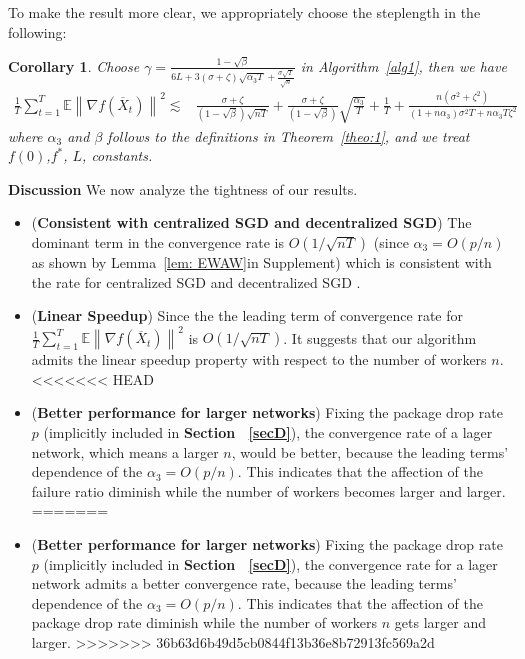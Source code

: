\documentclass{article}
\renewcommand{\paragraph}[1]{\noindent\textbf{#1}}
\newcounter{thm_counter}
\newtheorem{corollary}[thm_counter]{Corollary}
\begin{document}
To make the result more clear, we appropriately choose the steplength in the following:
\begin{corollary}\label{coro1}
Choose $\gamma = \frac{1-\sqrt{\beta}}{6L + 3(\sigma+\zeta)\sqrt{\alpha_3 T} + \frac{\sigma\sqrt{T}}{\sqrt{n}}}$ in Algorithm~\ref{alg1}, then we have
\begin{align*}
\frac{1}{T}\sum_{t=1}^T\mathbb{E}\left\|\nabla f(\overline{X}_{t})\right\|^2 
\lesssim & \frac{\sigma + \zeta}{(1-\sqrt{\beta})\sqrt{nT}} + \frac{\sigma + \zeta}{(1-\sqrt{\beta})}\sqrt{\frac{\alpha_3}{T}}
 + \frac{1}{T} + \frac{n(\sigma^2 + \zeta^2)}{(1 + n\alpha_3  )\sigma^2 T + n\alpha_3 T \zeta^2}
\end{align*}
where $\alpha_3$ and $\beta$ follows to the definitions in Theorem~\ref{theo:1}, and we treat $f(0)$,$f^*$, $L$, constants.
\end{corollary}


\paragraph{Discussion} We now analyze the tightness of our results.
\begin{itemize}
\item ({\bf Consistent with centralized SGD and decentralized SGD}) The dominant term in the convergence rate is $O(1/\sqrt{nT})$ (since $\alpha_3 = O(p/n)$ as shown by Lemma~\ref{lem: EWAW}in Supplement) which is consistent with the rate for centralized SGD and decentralized SGD \cite{lian2017can}.
\item ({\bf Linear Speedup}) Since the the leading term of convergence rate for $\frac{1}{T}\sum_{t=1}^T\mathbb{E}\left\|\nabla f(\overline{X}_{t})\right\|^2$ is $O(1/\sqrt{nT})$. It suggests that our algorithm admits the linear speedup property with respect to the number of workers $n$.
<<<<<<< HEAD
\item ({\bf Better performance for larger networks}) Fixing the package drop rate $p$ (implicitly included in \textbf{Section ~\ref{secD}}), the convergence rate of a lager network, which means a larger $n$, would be better, because the leading terms' dependence of the $\alpha_3 = O(p/n)$. This indicates that the affection of the failure ratio diminish while the number of workers becomes larger and larger.
=======
\item ({\bf Better performance for larger networks}) Fixing the package drop rate $p$ (implicitly included in \textbf{Section ~\ref{secD}}), the convergence rate for a lager network admits a better convergence rate, because the leading terms' dependence of the $\alpha_3 = O(p/n)$. This indicates that the affection of the package drop rate diminish while the number of workers $n$ gets larger and larger.
>>>>>>> 36b63d6b49d5cb0844f13b36e8b72913fc569a2d
\end{itemize}
\end{document}
